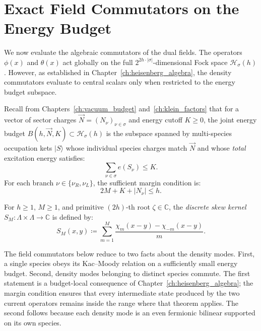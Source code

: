 \section{Exact Field Commutators on the Energy Budget}

We now evaluate the algebraic commutators of the dual fields. The operators $\phi(x)$ and $\theta(x)$ act globally on the full $2^{2h \cdot |\sigma|}$-dimensional Fock space $\mathcal{H}_\sigma(h)$. However, as established in Chapter~\ref{ch:heisenberg_algebra}, the density commutators evaluate to central scalars only when restricted to the energy budget subspace.

Recall from Chapters~\ref{ch:vacuum_budget} and~\ref{ch:klein_factors} that for a vector of sector charges $\vec{N} = (N_\nu)_{\nu \in \sigma}$ and energy cutoff $K \ge 0$, the joint energy budget $B(h, \vec{N}, K) \subset \mathcal{H}_\sigma(h)$ is the subspace spanned by multi-species occupation kets $|S\rangle$ whose individual species charges match $\vec{N}$ and whose \emph{total} excitation energy satisfies:
\begin{equation}
\sum_{\nu \in \sigma} e(S_\nu) \le K.
\end{equation}
For each branch $\nu \in \{\nu_R, \nu_L\}$, the sufficient margin condition is:
\begin{equation}
2M + K + |N_\nu| \le h.
\end{equation}

\begin{definition}
\label{def:skew_kernel}
For $h \ge 1$, $M \ge 1$, and primitive $(2h)$-th root $\zeta \in \mathbb{C}$, the \emph{discrete skew kernel} $S_M : \Lambda \times \Lambda \to \mathbb{C}$ is defined by:
\begin{equation}
S_M(x, y) \coloneqq \sum_{m=1}^M \frac{\chi_m(x - y) - \chi_{-m}(x - y)}{m}.
\end{equation}
\end{definition}

The field commutators below reduce to two facts about the density modes. First, a single species obeys its Kac--Moody relation on a sufficiently small energy budget. Second, density modes belonging to distinct species commute. The first statement is a budget-local consequence of Chapter~\ref{ch:heisenberg_algebra}; the margin condition ensures that every intermediate state produced by the two current operators remains inside the range where that theorem applies. The second follows because each density mode is an even fermionic bilinear supported on its own species.

